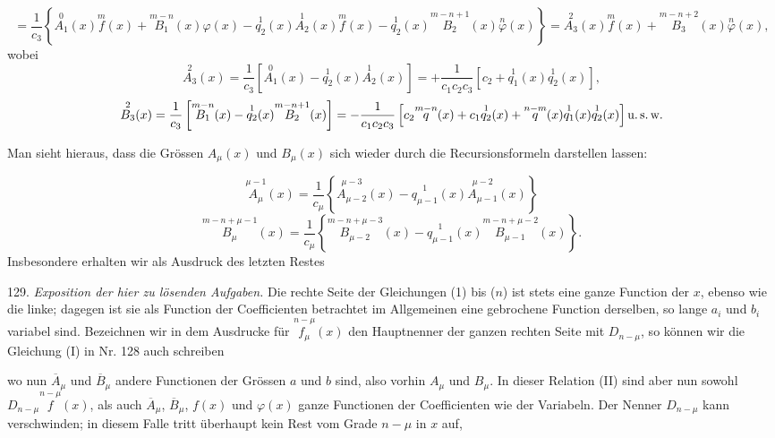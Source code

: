 \[
= \frac{1}{c_3}\left\{ \overset{0}{A_1}(x)\overset{m}{f}(x) + \overset{m-n}{B_1}(x)\varphi(x) - \overset{1}{q_2}(x)\overset{1}{A_2}(x)\overset{m}{f}(x) - \overset{1}{q_2}(x)\overset{m-n+1}{B_2}(x)\overset{n}{\varphi}(x) \right\} = \overset{2}{A_3}(x)\overset{m}{f}(x) + \overset{m-n+2}{B_3}(x)\overset{n}{\varphi}(x),
\]
wobei
\[
\overset{2}{A_3}(x) = \frac{1}{c_3}\left[ \overset{0}{A_1}(x) - \overset{1}{q_2}(x)\overset{1}{A_2}(x) \right] = +\frac{1}{c_1c_2c_3}\left[ c_2 + \overset{1}{q_1}(x)\overset{1}{q_2}(x) \right],
\]
\[
\overset{2}{B_3}(x) = \frac{1}{c_3}\left[ \overset{m-n}{B_1}(x) - \overset{1}{q_2}(x)\overset{m-n+1}{B_2}(x) \right] = -\frac{1}{c_1c_2c_3}\left[ c_2\overset{m-n}{q}(x) + c_1\overset{1}{q_2}(x) + \overset{n-m}{q}(x)\overset{1}{q_1}(x)\overset{1}{q_2}(x) \right] \text{u.\,s.\,w.}
\]

Man sieht hieraus, dass die Grössen $A_\mu(x)$ und $B_\mu(x)$ sich wieder
durch die Recursionsformeln darstellen lassen:

\[
\overset{\mu-1}{A_\mu}(x) = \frac{1}{c_\mu}\left\{ \overset{\mu-3}{A_{\mu-2}}(x) - \overset{1}{q_{\mu-1}}(x)\overset{\mu-2}{A_{\mu-1}}(x) \right\}
\]
\[
\overset{m-n+\mu-1}{B_\mu}(x) = \frac{1}{c_\mu}\left\{ \overset{m-n+\mu-3}{B_{\mu-2}}(x) - \overset{1}{q_{\mu-1}}(x)\overset{m-n+\mu-2}{B_{\mu-1}}(x) \right\}.
\]
Insbesondere erhalten wir als Ausdruck des letzten Restes


129. \textit{Exposition der hier zu lösenden Aufgaben.} Die rechte Seite
der Gleichungen (1) bis ($n$) ist stets eine ganze Function der $x$, ebenso
wie die linke; dagegen ist sie als Function der Coefficienten betrachtet
im Allgemeinen eine gebrochene Function derselben, so lange $a_i$ und $b_i$
variabel sind. Bezeichnen wir in dem Ausdrucke für $\overset{n-\mu}{f_\mu}(x)$ den Haupt\-nenner der ganzen rechten Seite mit $D_{n-\mu}$, so können wir die
Gleichung (I) in Nr. 128 auch schreiben


wo nun $\overline{A}_\mu$ und $\overline{B}_\mu$ andere Functionen der Grössen $a$ und $b$ sind,
also vorhin $A_\mu$ und $B_\mu$. In dieser Relation (II) sind aber nun sowohl
$D_{n-\mu}\overset{n-\mu}{f}(x)$, als auch $\overline{A}_\mu$, $\overline{B}_\mu$, $f(x)$ und $\varphi(x)$ ganze Functionen der
Coefficienten wie der Variabeln. Der Nenner $D_{n-\mu}$ kann verschwinden;
in diesem Falle tritt überhaupt kein Rest vom Grade $n-\mu$ in $x$ auf,


